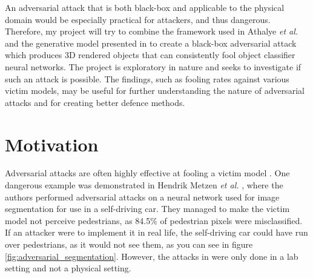 An adversarial attack that is both black-box and applicable to the physical domain would be especially practical for attackers, and thus dangerous. Therefore, my project will try to combine the framework used in Athalye \textit{et al.} \cite{athalye} and the generative model presented in \cite{zheng_black_box_GAN} to create a black-box adversarial attack which produces 3D rendered objects that can consistently fool object classifier neural networks. The project is exploratory in nature and seeks to investigate if such an attack is possible. The findings, such as fooling rates against various victim models, may be useful for further understanding the nature of adversarial attacks and for creating better defence methods.

\section{Motivation}
    \label{sec:motivation}
	
Adversarial attacks are often highly effective at fooling a victim model \cite{akhtar, silva_survey, dong2020benchmarking, robustart, fgsm}. One dangerous example was demonstrated in Hendrik Metzen \textit{et al.} \cite{Metzen_2017_ICCV}, where the authors performed adversarial attacks on a neural network used for image segmentation for use in a self-driving car. They managed to make the victim model not perceive pedestrians, as 84.5\% of pedestrian pixels were misclassified. If an attacker were to implement it in real life, the self-driving car could have run over pedestrians, as it would not see them, as you can see in figure \ref{fig:adversarial_segmentation}. However, the attacks in \cite{Metzen_2017_ICCV} were only done in a lab setting and not a physical setting.


